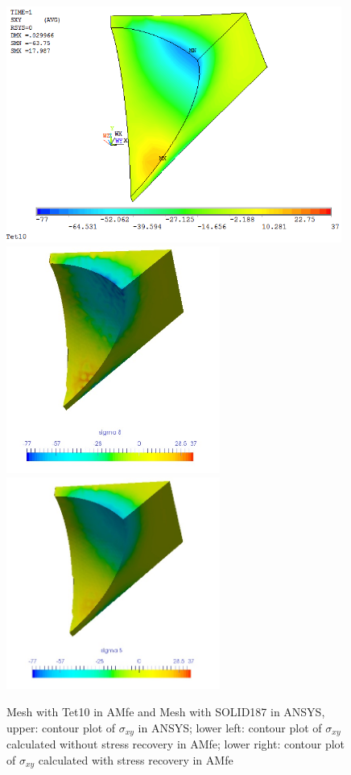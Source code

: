 \begin{figure}[htbp]
	\begin{center}
		\includegraphics[width=11cm,clip]{Tet10_Sxy.png} 	
		\includegraphics[width=7cm,clip]{Tet10_Sxy_PD.png} 		
		\includegraphics[width=7cm,clip]{Tet10_Sxy_P.png} 		
		\caption{Mesh with Tet10 in AMfe and Mesh with SOLID187 in ANSYS, upper: contour plot of $\sigma_{xy}$ in ANSYS; lower left: contour plot of $\sigma_{xy}$ calculated without stress recovery in AMfe; lower right: contour plot of $\sigma_{xy}$ calculated with stress recovery in AMfe} \label{fig: Tet10_Sxy}
	\end{center}
\end{figure}
\clearpage 

